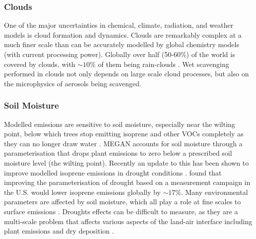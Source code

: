       
    
    \subsubsection{Clouds}
      \label{LR:Models:Uncert:Clouds}
      One of the major uncertainties in chemical, climate, radiation, and weather models is cloud formation and dynamics.
      Clouds are remarkably complex at a much finer scale than can be accurately modelled by global chemistry models (with current processing power).
      Globally over half (50-60\%) of the world is covered by clouds, with $\sim10\%$ of them being rain-clouds \parencite{Kanakidou2005}.
      Wet scavenging performed in clouds not only depends on large scale cloud processes, but also on the microphysics of aerosols being scavenged.
      
      
    
    \subsubsection{Soil Moisture}
      \label{LR:Models:Uncert:SoilMoisture}
      Modelled emissions are sensitive to soil moisture, especially near the wilting point, below which trees stop emitting isoprene and other VOCs completely as they can no longer draw water \parencite{Bauwens2016}.
      MEGAN accounts for soil moisture through a parameterisation that drops plant emissions to zero below a prescribed soil moisture level (the wilting point).
      Recently an update to this has been shown to improve modelled isoprene emissions in drought conditions \parencite{Jiang2018}.
      \textcite{Jiang2018} found that improving the parameterisation of drought based on a measurement campaign in the U.S. would lower isoprene emissions globally by $\sim17\%$.
      Many environmental parameters are affected by soil moisture, which all play a role at fine scales to surface emissions \parencite{Rowntree1983,Chen2001}.
      Droughts effects can be difficult to measure, as they are a multi-scale problem that affects various aspects of the land-air interface including plant emissions and dry deposition \parencite{Wang2017}.
      
